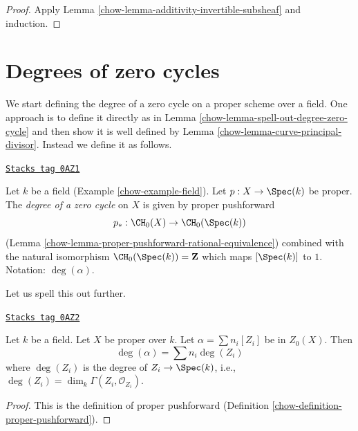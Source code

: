 \begin{proof}

Apply Lemma \ref{chow-lemma-additivity-invertible-subsheaf} and induction.
\end{proof}

\section{Degrees of zero cycles}
\label{chow-section-degree-zero-cycles}
We start defining the degree of a zero cycle on a proper scheme over a field.
One approach is to define it directly as in
Lemma \ref{chow-lemma-spell-out-degree-zero-cycle} and then show
it is well defined by
Lemma \ref{chow-lemma-curve-principal-divisor}.
Instead we define it as follows.

\begin{definition}
\label{chow-definition-degree-zero-cycle}
\href{https://stacks.math.columbia.edu/tag/0AZ1}{\texttt{Stacks tag 0AZ1}}

Let $k$ be a field (Example \ref{chow-example-field}). Let $p : X \to \Spec(k)$
be proper. The {\it degree of a zero cycle} on $X$ is given by proper
pushforward
$$
p_* : \CH_0(X) \to \CH_0(\Spec(k))
$$
(Lemma \ref{chow-lemma-proper-pushforward-rational-equivalence})
combined with the natural isomorphism $\CH_0(\Spec(k)) = \mathbf{Z}$
which maps $[\Spec(k)]$ to $1$. Notation: $\deg(\alpha)$.
\end{definition}

Let us spell this out further.

\begin{lemma}
\label{chow-lemma-spell-out-degree-zero-cycle}
\href{https://stacks.math.columbia.edu/tag/0AZ2}{\texttt{Stacks tag 0AZ2}}

Let $k$ be a field. Let $X$ be proper over $k$. Let $\alpha = \sum n_i[Z_i]$
be in $Z_0(X)$. Then
$$
\deg(\alpha) = \sum n_i\deg(Z_i)
$$
where $\deg(Z_i)$ is the degree of $Z_i \to \Spec(k)$, i.e.,
$\deg(Z_i) = \dim_k \Gamma(Z_i, \mathcal{O}_{Z_i})$.
\end{lemma}

\begin{proof}

This is the definition of proper pushforward
(Definition \ref{chow-definition-proper-pushforward}).
\end{proof}


